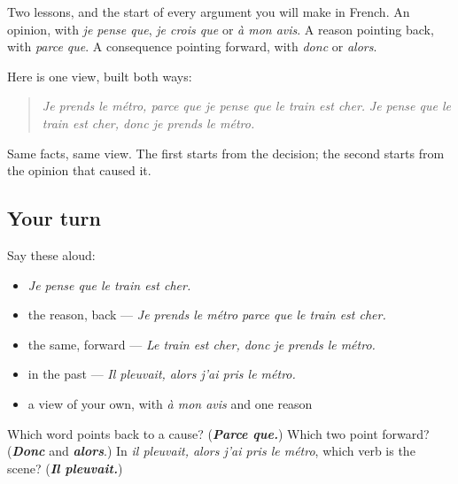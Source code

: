 \begin{grammarlens}[title={What you've built}]
Two lessons, and the start of every argument you will make in French. An opinion, with \emph{je pense que}, \emph{je crois que} or \emph{à mon avis}. A reason pointing back, with \emph{parce que}. A consequence pointing forward, with \emph{donc} or \emph{alors}.

Here is one view, built both ways:

\begin{quote}
\emph{Je prends le métro, parce que je pense que le train est cher.} \emph{Je pense que le train est cher, donc je prends le métro.}
\end{quote}

Same facts, same view. The first starts from the decision; the second starts from the opinion that caused it.
\end{grammarlens}

\subsection*{Your turn}
Say these aloud:

\begin{itemize}
\raggedright
  \item \emph{Je pense que le train est cher.}
  \item the reason, back — \emph{Je prends le métro parce que le train est cher.}
  \item the same, forward — \emph{Le train est cher, donc je prends le métro.}
  \item in the past — \emph{Il pleuvait, alors j'ai pris le métro.}
  \item a view of your own, with \emph{à mon avis} and one reason
\end{itemize}

\begin{tcolorbox}[breakable,colback=teal!4,colframe=teal!35!black,title={Before you move on}]
Which word points back to a cause? (\emph{\textbf{Parce que.}}) Which two point forward? (\emph{\textbf{Donc}} and \emph{\textbf{alors}}.) In \emph{il pleuvait, alors j'ai pris le métro}, which verb is the scene? (\emph{\textbf{Il pleuvait.}})
\end{tcolorbox}
